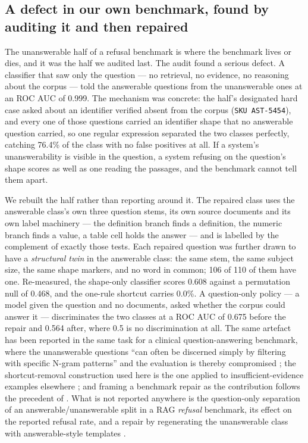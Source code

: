 \documentclass[conference]{IEEEtran}
\begin{document}
\subsection{A defect in our own benchmark, found by auditing it and then
repaired}
\label{sec:unansaudit}

The unanswerable half of a refusal benchmark is where the benchmark lives or
dies, and it was the half we audited last. The audit found a serious defect.
A classifier that saw only the question --- no retrieval, no evidence, no
reasoning about the corpus --- told the answerable questions from the
unanswerable ones at an ROC AUC of 0.999. The mechanism was
concrete: the half's designated hard case asked about an identifier verified
absent from the corpus (\texttt{SKU AST-5454}), and every one of those
questions carried an identifier shape that no answerable question carried, so
one regular expression separated the two classes perfectly, catching
76.4\% of the class with no false positives at all. If a
system's unanswerability is visible in the question, a system refusing on the
question's shape scores as well as one reading the passages, and the benchmark
cannot tell them apart.

We rebuilt the half rather than reporting around it. The repaired class uses
the answerable class's own three question stems, its own source documents and
its own label machinery --- the definition branch finds a definition, the
numeric branch finds a value, a table cell holds the answer --- and is labelled
by the complement of exactly those tests. Each repaired question was further
drawn to have a \emph{structural twin} in the answerable class: the same stem,
the same subject size, the same shape markers, and no word in common;
106 of 110 of them have one. Re-measured, the shape-only classifier
scores 0.608 against a permutation null of 0.468, and
the one-rule shortcut carries 0.0\%. A question-only policy
--- a model given the question and no documents, asked whether the corpus
could answer it --- discriminates the two classes at a ROC AUC of
0.675 before the repair and 0.564 after,
where 0.5 is no discrimination at all. The same artefact has been reported in
the same task for a clinical question-answering benchmark, where the
unanswerable questions ``can often be discerned simply by filtering with
specific N-gram patterns'' and the evaluation is thereby compromised
\cite{yang2024ehrsql}; the shortcut-removal construction used here is the one
applied to insufficient-evidence examples elsewhere
\cite{mondal2026beforeanswering}; and framing a benchmark repair as the
contribution follows the precedent of \cite{brunello2026folio}. What is not
reported anywhere is the question-only separation of an answerable/unanswerable
split in a RAG \emph{refusal} benchmark, its effect on the reported refusal
rate, and a repair by regenerating the unanswerable class with answerable-style
templates \cite{gautam2023unanswerable}.
\end{document}
